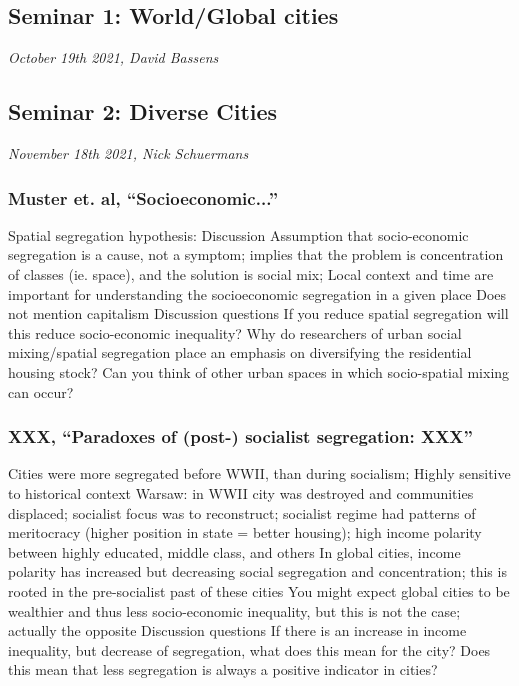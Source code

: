 \documentclass{article}
\begin{document}
\subsection{Seminar 1: World/Global cities}
\textit{October 19th 2021, David Bassens}


\subsection{Seminar 2: Diverse Cities}
\textit{November 18th 2021, Nick Schuermans}

\subsubsection{Muster et. al, ``Socioeconomic...''}
\begin{outline}
	\1 Spatial segregation hypothesis:
		\2 
	\1 Discussion
		\2 Assumption that socio-economic segregation is a cause, not a symptom; implies that the problem is concentration of classes (ie. space), and the solution is social mix; 
		\2 Local context and time are important for understanding the socioeconomic segregation in a given place
		\2 Does not mention capitalism
	\1 Discussion questions
		\2 If you reduce spatial segregation will this reduce socio-economic inequality?
		\2 Why do researchers of urban social mixing/spatial segregation place an emphasis on diversifying the residential housing stock? Can you think of other urban spaces in which socio-spatial mixing can occur?
\end{outline}

\subsubsection{XXX, ``Paradoxes of (post-) socialist segregation: XXX''}
\begin{outline}
	\1 Cities were more segregated before WWII, than during socialism; 
	\1 Highly sensitive to historical context
		\2 Warsaw: in WWII city was destroyed and communities displaced; socialist focus was to reconstruct; socialist regime had patterns of meritocracy (higher position in state = better housing); high income polarity between highly educated, middle class, and others
	\1 In global cities, income polarity has increased but  decreasing social segregation and concentration; this is rooted in the pre-socialist past of these cities
		\2 You might expect global cities to be wealthier and thus less socio-economic inequality, but this is not the case; actually the opposite
	\1 Discussion questions
		\2 If there is an increase in income inequality, but decrease of segregation, what does this mean for the city?
		\2 Does this mean that less segregation is always a positive indicator in cities?
\end{outline}
\end{document}
